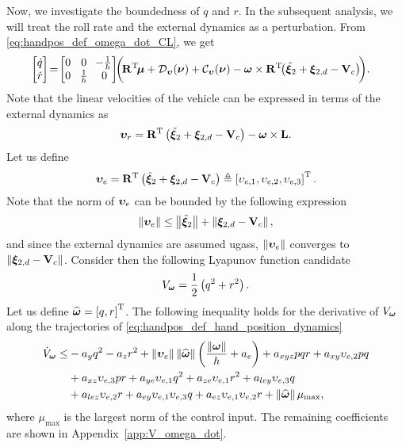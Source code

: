 Now, we investigate the boundedness of $q$ and $r$.
In the subsequent analysis, we will treat the roll rate and the external dynamics as a perturbation.
From \eqref{eq:handpos_def_omega_dot_CL}, we get
\begin{align}
    \begin{bmatrix}
        \dot{q} \\ \dot{r}
    \end{bmatrix}
    \!=\!
    \begin{bmatrix}
        0 & \!0\! & \!-\frac{1}{h} \\ 0 & \!\frac{1}{h}\! & 0
    \end{bmatrix} \!\!
    \bigg(\!&\mat{R}\T\!\bs{\mu} + \mathcal{D}_{\bvel}(\vel) + \mathcal{C}_{\bvel}(\vel)  - \bs{\omega} \times \mat{R}\T\!\!\left(\tilde{\bs{\xi}}_2 + \bs{\xi}_{2, d} - \ocean\right)\!\!\bigg).
    \label{eq:handpos_def_qr_dot}
\end{align}
Note that the linear velocities of the vehicle can be expressed in terms of the external dynamics as
\begin{equation}
    \bm{\upsilon}_r = \mathbf{R}^{\mathrm{T}} \left(\tilde{\bm{\xi}}_2 + \bm{\xi}_{2, d} - \mathbf{V}_c\right) - \bm{\omega} \times \mathbf{L}. \label{eq:handpos_def_nu_r_transformed}
\end{equation}
Let us define
\begin{equation}
    \bm{\upsilon}_e = \mathbf{R}^{\mathrm{T}} \left(\tilde{\bm{\xi}}_2 + \bm{\xi}_{2, d} - \mathbf{V}_c\right) \triangleq \left[\upsilon_{e, 1}, \upsilon_{e, 2}, \upsilon_{e, 3}\right]^{\mathrm{T}}.
\end{equation}
Note that the norm of $\bm{\upsilon}_e$ can be bounded by the following expression
\begin{equation}
    \left\|\bm{\upsilon}_e\right\| \leq \left\|\tilde{\bm{\xi}}_2\right\| + \left\|\bm{\xi}_{2, d} - \mathbf{V}_c\right\|,
\end{equation}
and since the external dynamics are assumed \glspl{ugas}, $\left\|\bm{\upsilon}_e\right\|$ converges to $\left\|\bm{\xi}_{2, d} - \mathbf{V}_c\right\|$.
Consider then the following Lyapunov function candidate
\begin{equation}
    V_{\bm{\omega}} = \frac{1}{2} \left(q^2 + r^2\right).
    \label{eq:handpos_def_V_omega}
\end{equation}
Let us define $\widehat{\bm{\omega}} = \left[q, r\right]^{\mathrm{T}}$.
The following inequality holds for the derivative of $V_{\bm{\omega}}$ along the trajectories of \eqref{eq:handpos_def_hand_position_dynamics}
\begin{align}
    \dot{V}_{\bm{\omega}} \leq& -a_yq^2 - a_zr^2 + \left\|\bm{\upsilon}_e\right\|\left\|\widehat{\bm{\omega}}\right\|\left(\frac{\left\|\bm{\omega}\right\|}{h} + a_e\right) + a_{xyz}pqr + a_{xy}\upsilon_{e, 2}pq \label{eq:handpos_def_V_omega_dot}\\
    & + a_{xz}\upsilon_{e, 3}pr + a_{ye}\upsilon_{e, 1}q^2 + a_{ze}\upsilon_{e, 1}r^2 + a_{ley}\upsilon_{e, 3}q \nonumber \\
    & + a_{lez}\upsilon_{e, 2}r + a_{ey}\upsilon_{e, 1}\upsilon_{e, 3}q + a_{ez}\upsilon_{e, 1}\upsilon_{e, 2}r + \left\|\widehat{\bm{\omega}}\right\|\mu_{\max}, \nonumber
\end{align}
where $\mu_{\max}$ is the largest norm of the control input.
The remaining coefficients are shown in Appendix~\ref{app:V_omega_dot}.

